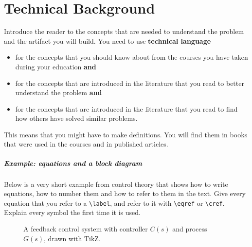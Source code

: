 \chapter{Technical Background}
\label{chap:tech_bg}
\begin{instructions}
Introduce the reader to the concepts that are needed to understand the problem and the artifact you will build.
You need to use \textbf{technical language}
\begin{itemize}
    \item for the concepts that you should know about from the courses you have taken during your education \textbf{and}
    \item for the concepts that are introduced in the literature that you read to better understand the problem \textbf{and}
    \item for the concepts that are introduced in the literature that you read to find how others have solved similar problems.
\end{itemize}
This means that you might have to make definitions. You will find them in books that were used in the courses and in published articles.

\paragraph{Example: equations and a block diagram}
Below is a very short example from control theory that shows how to write equations, how to number them and how to refer to them in the text. Give every equation that you refer to a \texttt{\textbackslash label}, and refer to it with \texttt{\textbackslash eqref} or \texttt{\textbackslash cref}. Explain every symbol the first time it is used.

\begin{figure}[htbp]
  \centering
  \caption{A feedback control system with controller $C(s)$ and process $G(s)$, drawn with TikZ.}
  \label{fig:feedback}
\end{figure}


\end{instructions}
